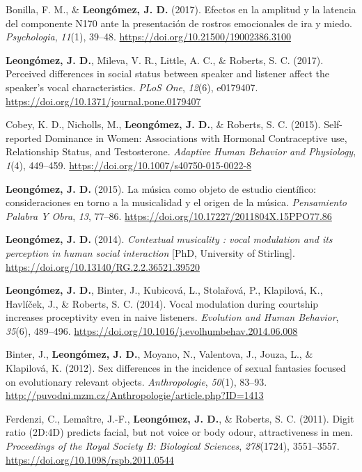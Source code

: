 \documentclass[11pt, a4paper]{awesome-cv}
\begin{document}
\leavevmode\hypertarget{ref-BonillaCarreno2017}{}%
Bonilla, F. M., \& \textbf{Leongómez, J. D.} (2017). Efectos en la amplitud y la latencia del componente N170 ante la presentación de rostros emocionales de ira y miedo. \emph{Psychologia}, \emph{11}(1), 39--48. \url{https://doi.org/10.21500/19002386.3100}

\leavevmode\hypertarget{ref-Leongomez2017}{}%
\textbf{Leongómez, J. D.}, Mileva, V. R., Little, A. C., \& Roberts, S. C. (2017). Perceived differences in social status between speaker and listener affect the speaker's vocal characteristics. \emph{PLoS One}, \emph{12}(6), e0179407. \url{https://doi.org/10.1371/journal.pone.0179407}

\leavevmode\hypertarget{ref-Cobey2015}{}%
Cobey, K. D., Nicholls, M., \textbf{Leongómez, J. D.}, \& Roberts, S. C. (2015). Self-reported Dominance in Women: Associations with Hormonal Contraceptive use, Relationship Status, and Testosterone. \emph{Adaptive Human Behavior and Physiology}, \emph{1}(4), 449--459. \url{https://doi.org/10.1007/s40750-015-0022-8}

\leavevmode\hypertarget{ref-Leongomez2015}{}%
\textbf{Leongómez, J. D.} (2015). La música como objeto de estudio científico: consideraciones en torno a la musicalidad y el origen de la música. \emph{Pensamiento Palabra Y Obra}, \emph{13}, 77--86. \url{https://doi.org/10.17227/2011804X.15PPO77.86}

\leavevmode\hypertarget{ref-Leongomez2014a}{}%
\textbf{Leongómez, J. D.} (2014). \emph{Contextual musicality : vocal modulation and its perception in human social interaction} {[}PhD, University of Stirling{]}. \url{https://doi.org/10.13140/RG.2.2.36521.39520}

\leavevmode\hypertarget{ref-Leongomez2014}{}%
\textbf{Leongómez, J. D.}, Binter, J., Kubicová, L., Stolařová, P., Klapilová, K., Havlíček, J., \& Roberts, S. C. (2014). Vocal modulation during courtship increases proceptivity even in naive listeners. \emph{Evolution and Human Behavior}, \emph{35}(6), 489--496. \url{https://doi.org/10.1016/j.evolhumbehav.2014.06.008}

\leavevmode\hypertarget{ref-Binter2012}{}%
Binter, J., \textbf{Leongómez, J. D.}, Moyano, N., Valentova, J., Jouza, L., \& Klapilová, K. (2012). Sex differences in the incidence of sexual fantasies focused on evolutionary relevant objects. \emph{Anthropologie}, \emph{50}(1), 83--93. \url{http://puvodni.mzm.cz/Anthropologie/article.php?ID=1413}

\leavevmode\hypertarget{ref-Ferdenzi2011}{}%
Ferdenzi, C., Lemaître, J.-F., \textbf{Leongómez, J. D.}, \& Roberts, S. C. (2011). Digit ratio (2D:4D) predicts facial, but not voice or body odour, attractiveness in men. \emph{Proceedings of the Royal Society B: Biological Sciences}, \emph{278}(1724), 3551--3557. \url{https://doi.org/10.1098/rspb.2011.0544}
\end{document}
